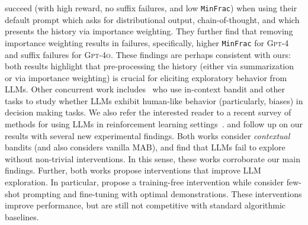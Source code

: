 \documentclass[11pt]{article}
\newcommand{\gptfour}{\textsc{Gpt-4}\xspace}
\newcommand{\gptfouro}{\textsc{Gpt-4o}\xspace}
\newcommand{\MinFrac}{\texttt{MinFrac}}
\newcommand{\xhdr}[1]{\vspace{2mm} \noindent{\bf #1}}
\begin{document}
succeed (with high reward, no suffix failures, and low \MinFrac) when
using their default prompt which asks for distributional output,
chain-of-thought, and which presents the history via importance
weighting. They further find that removing importance weighting
results in failures, specifically, higher \MinFrac\xspace for \gptfour
and suffix failures for \gptfouro. These findings are perhaps
consistent with ours: both results highlight that pre-processing the
history (either via summarization or via importance weighting) is
crucial for eliciting exploratory behavior from LLMs.
Other concurrent work includes~\citet{schubert2024context,hayes2024relative,coda2024cogbench} who use in-context bandit and other tasks to study whether LLMs exhibit human-like behavior (particularly, biases) in decision making tasks.
We also refer the interested reader to a recent survey of methods for using LLMs in reinforcement learning settings~\citep{cao2024survey}.
\xhdr{Follow-up work.}
\citet{monea2024llms} and \citet{nie2024evolve} follow up on our results with several new experimental findings. Both works consider \emph{contextual} bandits (and \citet{nie2024evolve} also considers vanilla MAB), and find that LLMs fail to explore without non-trivial interventions. In this sense, these works corroborate our main findings. Further, both works propose interventions that improve LLM exploration. In particular, \citet{monea2024llms} propose a training-free intervention 
while \citet{nie2024evolve} consider few-shot prompting and fine-tuning with optimal demonstrations. These interventions improve performance, but are still not competitive with standard algorithmic baselines.
\end{document}
